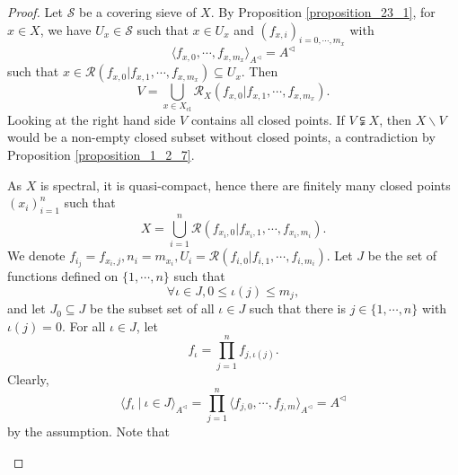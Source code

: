 \documentclass[10pt]{article}
\numberwithin{equation}{section}
\theoremstyle{definition}
\newcommand{\cR}[0]{\mathcal{R}}
\newcommand{\sep}[0]{\:|\:}
\newcommand{\sS}[0]{\mathscr{S}}
\begin{document}
\begin{proof}
    Let $\sS$ be a covering sieve of $X$. By Proposition \ref{proposition_23_1}, for $x\in X$, we have $U_x\in\sS$ such that $x\in U_x$ and $(f_{x,i})_{i=0,\cdots,m_x}$ with
    \begin{equation*}
        \langle f_{x,0},\cdots,f_{x,m_x}\rangle_{A^\triangleleft} = A^\triangleleft
    \end{equation*}
    such that $x\in\cR(f_{x,0}|f_{x,1},\cdots,f_{x,m_x})\subseteq U_x$. Then
    \begin{equation*}
        V = \bigcup_{x\in X_{\mathrm{cl}}}\cR_X(f_{x,0}|f_{x,1},\cdots,f_{x,m_x}).
    \end{equation*}
    Looking at the right hand side $V$ contains all closed points. If $V\subsetneqq X$, then $X\backslash V$ would be a non-empty closed subset without closed points, a contradiction by Proposition \ref{proposition_1_2_7}.
    \par As $X$ is spectral, it is quasi-compact, hence there are finitely many closed points $(x_i)_{i=1}^n$ such that
    \begin{equation*}
        X = \bigcup_{i=1}^n\cR(f_{x_i,0}|f_{x_i,1},\cdots,f_{x_i,m_i}).
    \end{equation*}
    We denote $f_{i_j} = f_{x_i,j},n_i = m_{x_i},U_i = \cR(f_{i,0}|f_{i,1},\cdots,f_{i,m_i})$. Let $J$ be the set of functions defined on $\{1,\cdots,n\}$ such that
    \begin{equation*}
       \forall \iota\in J, 0\leq \iota(j)\leq m_j,
    \end{equation*}
    and let $J_0\subseteq J$ be the subset set of all $\iota\in J$ such that there is $j\in\{1,\cdots,n\}$ with $\iota(j)=0$. For all $\iota\in J$, let
    \begin{equation*}
        f_\iota = \prod_{j=1}^nf_{j,\iota(j)}.
    \end{equation*}
    Clearly,
    \begin{equation*}
        \langle f_\iota\sep \iota\in J\rangle_{A^\triangleleft} = \prod_{j=1}^n\langle f_{j,0},\cdots,f_{j,m}\rangle_{A^\triangleleft}=A^\triangleleft
    \end{equation*}
    by the assumption. Note that
    \begin{enumerate}[i.]

\end{enumerate}
\end{proof}
\end{document}
